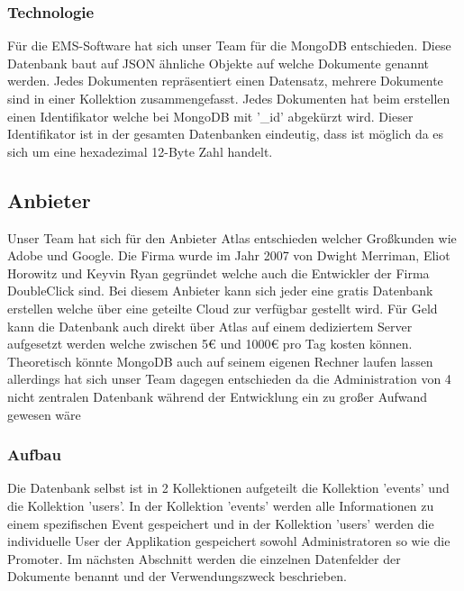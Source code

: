 		\subsubsection{Technologie}
			Für die EMS-Software hat sich unser Team für die MongoDB entschieden. Diese Datenbank baut auf JSON ähnliche Objekte auf welche Dokumente genannt werden. Jedes Dokumenten repräsentiert einen Datensatz, mehrere Dokumente sind in einer Kollektion zusammengefasst. Jedes Dokumenten hat beim erstellen einen Identifikator welche bei MongoDB mit '\_id' abgekürzt wird. Dieser Identifikator ist in der gesamten Datenbanken eindeutig, dass ist möglich da es sich um eine hexadezimal 12-Byte Zahl handelt. 
		
		\subsection{Anbieter}
			Unser Team hat sich für den Anbieter Atlas entschieden welcher Großkunden wie Adobe und Google. Die Firma wurde im Jahr 2007 von Dwight Merriman, Eliot Horowitz und Keyvin Ryan gegründet welche auch die Entwickler der Firma DoubleClick sind. Bei diesem Anbieter kann sich jeder eine gratis Datenbank erstellen welche über eine geteilte Cloud zur verfügbar gestellt wird. Für Geld kann die Datenbank auch direkt über Atlas auf einem dediziertem Server aufgesetzt werden welche zwischen 5€ und 1000€ pro Tag kosten können. Theoretisch könnte MongoDB auch auf seinem eigenen Rechner laufen lassen allerdings hat sich unser Team dagegen entschieden da die Administration von 4 nicht zentralen Datenbank während der Entwicklung ein zu großer Aufwand gewesen wäre
		
		\newpage		
		\subsubsection{Aufbau}
			Die Datenbank selbst ist in 2 Kollektionen aufgeteilt die Kollektion 'events' und die Kollektion 'users'. In der Kollektion 'events' werden alle Informationen zu einem spezifischen Event gespeichert und in der Kollektion 'users' werden die individuelle User der Applikation gespeichert sowohl Administratoren so wie die Promoter. Im nächsten Abschnitt werden die einzelnen Datenfelder der Dokumente benannt und der Verwendungszweck beschrieben.

